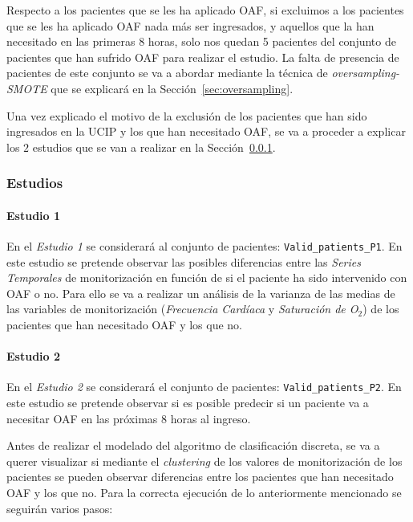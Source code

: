 Respecto a los pacientes que se les ha aplicado OAF, si excluimos a los pacientes que se les ha aplicado OAF nada más ser ingresados, y aquellos que la han necesitado en las primeras $8$ horas, solo nos quedan 5 pacientes del conjunto de pacientes que han sufrido OAF para realizar el estudio. La falta de presencia de pacientes de este conjunto se va a abordar mediante la técnica de \textit{oversampling-SMOTE} que se explicará en la Sección~\ref{sec:oversampling}.

Una vez explicado el motivo de la exclusión de los pacientes que han sido ingresados en la UCIP y los que han necesitado OAF, se va a proceder a explicar los $2$ estudios que se van a realizar en la Sección~\ref{sec:estudios}.

\subsubsection{Estudios}\label{sec:estudios}

\paragraph{Estudio 1}\label{sec:estudio1}

En el \textit{Estudio 1} se considerará al conjunto de pacientes: \texttt{Valid\_patients\_P1}. En este estudio se pretende observar las posibles diferencias entre las \textit{Series Temporales} de monitorización en función de si el paciente ha sido intervenido con OAF o no. Para ello se va a realizar un análisis de la varianza de las medias de las variables de monitorización (\textit{Frecuencia Cardíaca} y \textit{Saturación de O$_2$}) de los pacientes que han necesitado OAF y los que no.

\paragraph{Estudio 2}\label{sec:estudio2}

En el \textit{Estudio 2} se considerará el conjunto de pacientes: \texttt{Valid\_patients\_P2}. En este estudio se pretende observar si es posible predecir si un paciente va a necesitar OAF en las próximas $8$ horas al ingreso. 

Antes de realizar el modelado del algoritmo de clasificación discreta, se va a querer visualizar si mediante el \textit{clustering} de los valores de monitorización de los pacientes se pueden observar diferencias entre los pacientes que han necesitado OAF y los que no. Para la correcta ejecución de lo anteriormente mencionado se seguirán varios pasos:

